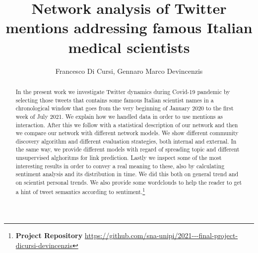 \documentclass[sigchi]{acmart}
\begin{document}
%
\title{Network analysis of Twitter mentions addressing famous Italian medical scientists}

%
\author{Francesco Di Cursi, Gennaro Marco Devincenzis}

\renewcommand{\shortauthors}{One and Two, et al.}


\begin{abstract}
In the present work we investigate Twitter dynamics during Covid-19 pandemic by selecting those tweets that contains some famous Italian scientist names in a chronological window that goes from the very beginning of January 2020 to the first week of July 2021. We explain how we handled data in order to use mentions as interaction. After this we follow with a statistical description of our network and then we compare our network with different network models. We show different community discovery algorithm and different evaluation strategies, both internal and external. In the same way, we provide different models with regard of spreading topic and different unsupervised alghoritms for link prediction.
Lastly we inspect some of the most interesting results in order to convey a real meaning to these, also by calculating sentiment analysis and its distribution in time. We did this both on general trend and on scientist personal trends. We also provide some wordclouds to help the reader to get a hint of tweet semantics according to sentiment.\footnote{
{\bf Project Repository}
\noindent \url{https://github.com/sna-unipi/2021---final-project-dicursi-devincenzis}}
\end{abstract}




%


%
\maketitle
\end{document}
